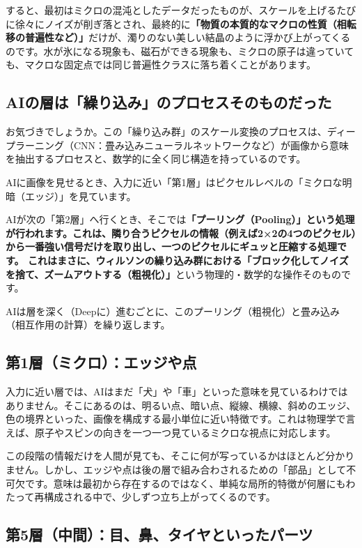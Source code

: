 すると、最初はミクロの混沌としたデータだったものが、スケールを上げるたびに徐々にノイズが削ぎ落とされ、最終的に\textbf{「物質の本質的なマクロの性質（相転移の普遍性など）」}だけが、濁りのない美しい結晶のように浮かび上がってくるのです。水が氷になる現象も、磁石ができる現象も、ミクロの原子は違っていても、マクロな固定点では同じ普遍性クラスに落ち着くことがあります。

\subsection{AIの層は「繰り込み」のプロセスそのものだった}

お気づきでしょうか。この「繰り込み群」のスケール変換のプロセスは、ディープラーニング（CNN：畳み込みニューラルネットワークなど）が画像から意味を抽出するプロセスと、数学的に全く同じ構造を持っているのです。

AIに画像を見せるとき、入力に近い「第1層」はピクセルレベルの「ミクロな明暗（エッジ）」を見ています。

AIが次の「第2層」へ行くとき、そこでは\textbf{「プーリング（Pooling）」という処理が行われます。これは、隣り合うピクセルの情報（例えば2×2の4つのピクセル）から一番強い信号だけを取り出し、一つのピクセルにギュッと圧縮する処理です。 これはまさに、ウィルソンの繰り込み群における「ブロック化してノイズを捨て、ズームアウトする（粗視化）」}という物理的・数学的な操作そのものです。

AIは層を深く（Deepに）進むごとに、このプーリング（粗視化）と畳み込み（相互作用の計算）を繰り返します。

\subsection{第1層（ミクロ）：エッジや点}

入力に近い層では、AIはまだ「犬」や「車」といった意味を見ているわけではありません。そこにあるのは、明るい点、暗い点、縦線、横線、斜めのエッジ、色の境界といった、画像を構成する最小単位に近い特徴です。これは物理学で言えば、原子やスピンの向きを一つ一つ見ているミクロな視点に対応します。

この段階の情報だけを人間が見ても、そこに何が写っているかはほとんど分かりません。しかし、エッジや点は後の層で組み合わされるための「部品」として不可欠です。意味は最初から存在するのではなく、単純な局所的特徴が何層にもわたって再構成される中で、少しずつ立ち上がってくるのです。

\subsection{第5層（中間）：目、鼻、タイヤといったパーツ}

